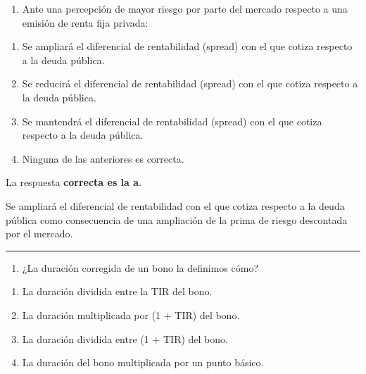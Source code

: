 \documentclass[
  letterpaper,
  DIV=11,
  numbers=noendperiod]{scrreprt}
\providecommand{\tightlist}{%
  \setlength{\itemsep}{0pt}\setlength{\parskip}{0pt}}\usepackage{longtable,booktabs,array}
\begin{document}
\begin{tcolorbox}
\begin{enumerate}
\def\labelenumi{\arabic{enumi}.}
\setcounter{enumi}{16}
\tightlist
\item
  Ante una percepción de mayor riesgo por parte del mercado respecto a
  una emisión de renta fija privada:
\end{enumerate}

\begin{enumerate}
\def\labelenumi{\alph{enumi}.}
\item
  Se ampliará el diferencial de rentabilidad (spread) con el que cotiza
  respecto a la deuda pública.
\item
  Se reducirá el diferencial de rentabilidad (spread) con el que cotiza
  respecto a la deuda pública.
\item
  Se mantendrá el diferencial de rentabilidad (spread) con el que cotiza
  respecto a la deuda pública.
\item
  Ninguna de las anteriores es correcta.
\end{enumerate}

\begin{tcolorbox}[enhanced jigsaw, toprule=.15mm, left=2mm, arc=.35mm, breakable, bottomrule=.15mm, opacityback=0, rightrule=.15mm, leftrule=.75mm, colframe=quarto-callout-note-color-frame, colback=white]
\begin{minipage}[t]{5.5mm}
\textcolor{quarto-callout-note-color}{\faInfo}
\end{minipage}%
\begin{minipage}[t]{\textwidth - 5.5mm}

La respuesta \textbf{correcta es la a}.

Se ampliará el diferencial de rentabilidad con el que cotiza respecto a
la deuda pública como consecuencia de una ampliación de la prima de
riesgo descontada por el mercado.

\end{minipage}%
\end{tcolorbox}

\begin{center}\rule{0.5\linewidth}{0.5pt}\end{center}

\begin{enumerate}
\def\labelenumi{\arabic{enumi}.}
\setcounter{enumi}{17}
\tightlist
\item
  ¿La duración corregida de un bono la definimos cómo?
\end{enumerate}

\begin{enumerate}
\def\labelenumi{\alph{enumi}.}
\item
  La duración dividida entre la TIR del bono.
\item
  La duración multiplicada por (1 + TIR) del bono.
\item
  La duración dividida entre (1 + TIR) del bono.
\item
  La duración del bono multiplicada por un punto básico.
\end{enumerate}


\end{tcolorbox}
\end{document}
